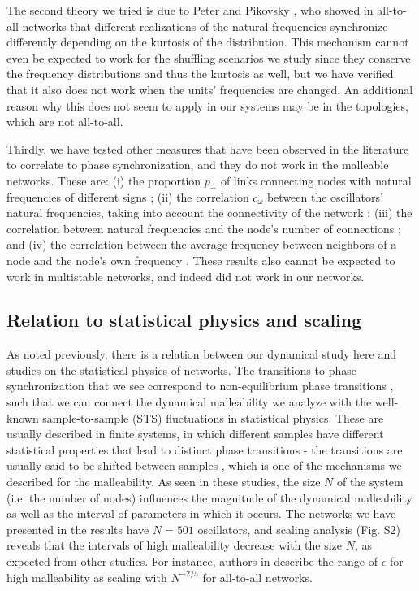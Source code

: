 The second theory we tried is due to Peter and Pikovsky \cite{peter2018transition}, who showed in all-to-all networks that different realizations of the natural frequencies synchronize differently depending on the kurtosis of the distribution. This mechanism cannot even be expected to work for the shuffling scenarios we study since they conserve the frequency distributions and thus the kurtosis as well, but we have verified that it also does not work when the units' frequencies are changed. An additional reason why this does not seem to apply in our systems may be in the topologies, which are not all-to-all.

Thirdly, we have tested other measures that have been observed in the literature to correlate to phase synchronization, and they do not work in the malleable networks. These are: (i) the proportion $p_-$ of links connecting nodes with natural frequencies of different signs \cite{brede2008synchrony};  (ii) the correlation $c_\omega$ between the oscillators' natural frequencies, taking into account the connectivity of the network \cite{brede2008synchrony, carareto2009optimized}; (iii) the correlation between natural frequencies and the node's number of connections \cite{skardal2014optimal}; and (iv) the correlation between the average frequency between neighbors of a node and the node's own frequency \cite{buzna2009synchronization, skardal2014optimal}. These results also cannot be expected to work in multistable networks, and indeed did not work in our networks. 


\subsection*{Relation to statistical physics and scaling}
As noted previously, there is a relation between our dynamical study here and studies on the statistical physics of networks. The transitions to phase synchronization that we see correspond to non-equilibrium phase transitions \cite{kuramoto1984chemical, peter2018transition}, such that we can connect the dynamical malleability we analyze with the well-known sample-to-sample (STS) fluctuations in statistical physics. These are usually described in finite systems, in which different samples have different statistical properties that lead to distinct phase transitions - the transitions are usually said to be shifted between samples \cite{sornette2006critical, hong2007finitesizescalingpre, hong2007entrainment}, which is one of the mechanisms we described for the malleability.
As seen in these studies, the size $N$ of the system (i.e. the number of nodes) influences the magnitude of the dynamical malleability as well as the interval of parameters in which it occurs. The networks we have presented in the results have $N = 501$ oscillators, and scaling analysis (Fig. S2) reveals that the intervals of high malleability decrease with the size $N$, as expected from other studies. For instance, authors in \cite{hong2007entrainment} describe the range of $\epsilon$ for high malleability as scaling with $N^{-2/5}$ for all-to-all networks. 


